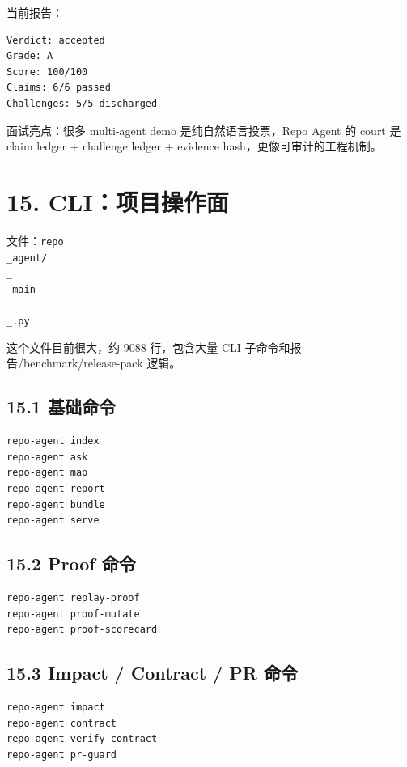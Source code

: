 \documentclass[UTF8,12pt,openany]{ctexbook}
\begin{document}
当前报告：\par

\begin{lstlisting}
Verdict: accepted
Grade: A
Score: 100/100
Claims: 6/6 passed
Challenges: 5/5 discharged
\end{lstlisting}

面试亮点：很多 multi-agent demo 是纯自然语言投票，Repo Agent 的 court 是 claim ledger + challenge ledger + evidence hash，更像可审计的工程机制。\par

\section{15. CLI：项目操作面}

文件：\texttt{repo\\_agent/\\_\\_main\\_\\_.py}\par

这个文件目前很大，约 9088 行，包含大量 CLI 子命令和报告/benchmark/release-pack 逻辑。\par

\subsection{15.1 基础命令}

\begin{lstlisting}
repo-agent index
repo-agent ask
repo-agent map
repo-agent report
repo-agent bundle
repo-agent serve
\end{lstlisting}

\subsection{15.2 Proof 命令}

\begin{lstlisting}
repo-agent replay-proof
repo-agent proof-mutate
repo-agent proof-scorecard
\end{lstlisting}

\subsection{15.3 Impact / Contract / PR 命令}

\begin{lstlisting}
repo-agent impact
repo-agent contract
repo-agent verify-contract
repo-agent pr-guard
\end{lstlisting}
\end{document}
